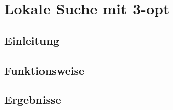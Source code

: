 \chapter{Lokale Suche mit 3-opt}
\section{Einleitung}
\section{Funktionsweise}
\section{Ergebnisse}

